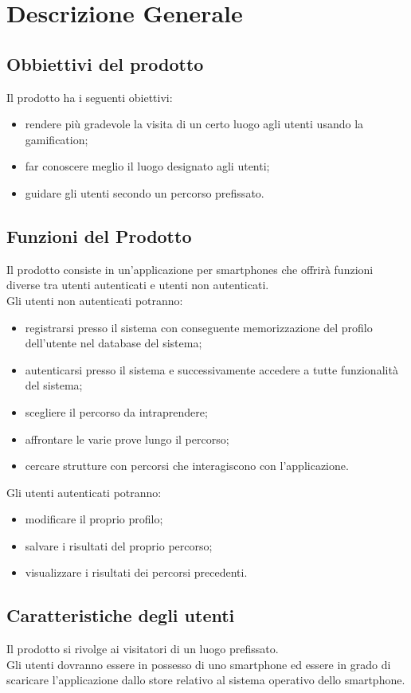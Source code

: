 \section{Descrizione Generale}
\label{sec:DescrizioneGenerale}

	\subsection{Obbiettivi del prodotto}
	\label{sec:ObbiettiviDelProdotto}
		Il prodotto ha i seguenti obiettivi:
		\begin{itemize}
			\item rendere più gradevole la visita di un certo luogo agli utenti usando la gamification;
			\item far conoscere meglio il luogo designato agli utenti;
			\item guidare gli utenti secondo un percorso prefissato.
		\end{itemize}
	
	\subsection{Funzioni del Prodotto}
	\label{sub:Funzioni del Prodotto}
		Il prodotto consiste in un'applicazione per smartphones che offrirà funzioni diverse tra utenti autenticati e utenti non autenticati. \\
		Gli utenti non autenticati potranno:
		\begin{itemize}
			\item registrarsi presso il sistema con conseguente memorizzazione del profilo dell'utente nel database del sistema;
			\item autenticarsi presso il sistema e successivamente accedere a tutte funzionalità del sistema;
			\item scegliere il percorso da intraprendere;
			\item affrontare le varie prove lungo il percorso;
			\item cercare strutture con percorsi che interagiscono con l'applicazione.
		\end{itemize}
		Gli utenti autenticati potranno:
		\begin{itemize}
			\item modificare il proprio profilo;
			\item salvare i risultati del proprio percorso;
			\item visualizzare i risultati dei percorsi precedenti.
		\end{itemize}
	
	\subsection{Caratteristiche degli utenti}
	\label{sub:Caratteristiche degli utenti}
		Il prodotto si rivolge ai visitatori di un luogo prefissato. \\
		Gli utenti dovranno essere in possesso di uno smartphone ed essere in grado di scaricare l'applicazione dallo store relativo al sistema operativo dello smartphone. 